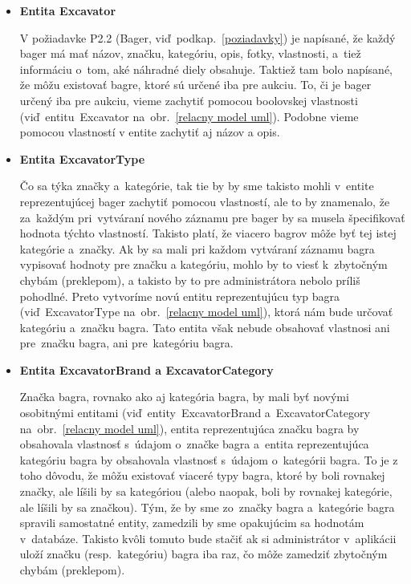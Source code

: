 \begin{itemize}
\item \textbf{Entita Excavator}

V požiadavke P2.2 (Bager, viď~podkap.~\ref{poziadavky}) je napísané, že každý bager má mať názov, značku, kategóriu, opis, fotky, vlastnosti, a~tiež informáciu o~tom, aké náhradné diely obsahuje. Taktiež tam bolo napísané, že môžu existovať bagre, ktoré sú určené iba pre aukciu. To, či je bager určený iba pre aukciu, vieme zachytiť pomocou boolovskej vlastnosti (viď~entitu~Excavator na~obr.~\ref{relacny model uml}). Podobne vieme pomocou vlastností v entite zachytiť aj názov a opis.

\item \textbf{Entita ExcavatorType}

Čo sa týka značky a~kategórie, tak tie by by sme takisto mohli v~entite reprezentujúcej bager zachytiť pomocou vlastností, ale to by znamenalo, že za~každým pri~vytváraní nového záznamu pre bager by sa musela špecifikovať hodnota týchto vlastností. Takisto platí, že viacero bagrov môže byť tej istej kategórie a~značky. Ak by sa mali pri každom vytváraní záznamu bagra vypisovať hodnoty pre značku a kategóriu, mohlo by to viesť k~zbytočným chybám (preklepom), a takisto by to pre administrátora nebolo príliš pohodlné. Preto vytvoríme novú entitu reprezentujúcu typ bagra (viď~ExcavatorType na~obr.~\ref{relacny model uml}), ktorá nám bude určovať kategóriu a~značku bagra. Tato entita však nebude obsahovať vlastnosi ani pre~značku bagra, ani pre~kategóriu bagra.

\item \textbf{Entita ExcavatorBrand a ExcavatorCategory}

Značka bagra, rovnako ako aj kategória bagra, by mali byť novými osobitnými entitami (viď~entity~ExcavatorBrand a~ExcavatorCategory na~obr.~\ref{relacny model uml}), entita reprezentujúca značku bagra by obsahovala vlastnosť s~údajom o~značke bagra a~entita reprezentujúca kategóriu bagra by obsahovala vlastnosť s~údajom o~kategórii bagra. To je z toho dôvodu, že môžu existovať viaceré typy bagra, ktoré by boli rovnakej značky, ale líšili by sa kategóriou (alebo naopak, boli by rovnakej kategórie, ale líšili by sa značkou). Tým, že by sme zo~značky bagra a~kategórie bagra spravili samostatné entity, zamedzili by sme opakujúcim sa hodnotám v~databáze. Takisto kvôli tomuto bude stačiť ak si administrátor v~aplikácii uloží značku (resp.~kategóriu) bagra iba raz, čo môže zamedziť zbytočným chybám (preklepom).


\end{itemize}
